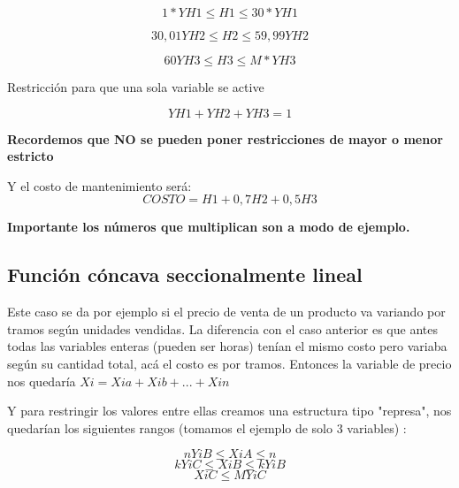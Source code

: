 \documentclass[titlepage,a4paper]{article}
\begin{document}
$$ 1*YH1 \leq H1 \leq 30*YH1 $$

$$ 30,01 YH2 \leq H2 \leq 59,99 YH2$$  

$$60 YH3 \leq H3 \leq M*YH3$$

Restricción para que una sola variable se active

$$YH1 + YH2 + YH3 = 1$$

\textbf{Recordemos que NO se pueden poner restricciones de mayor o menor estricto}

Y el costo de mantenimiento será:
$$ COSTO = H1 + 0,7H2 + 0,5H3 $$

\textbf{Importante los números que multiplican son a modo de ejemplo.}

\vspace{1cm}

\subsection{Función cóncava seccionalmente lineal}

Este caso se da por ejemplo si el precio de venta de un producto va variando por tramos según unidades vendidas. La diferencia con el caso anterior
es que antes todas las variables enteras (pueden ser horas) tenían el mismo costo pero variaba según su cantidad total, acá el costo es por tramos. 
Entonces la variable de precio nos quedaría $Xi = Xia + Xib + ... + Xin$

Y para restringir los valores entre ellas creamos una estructura tipo "represa", nos quedarían los siguientes rangos (tomamos el ejemplo de solo 3 variables) :

$$ n YiB \leq XiA \leq n $$
$$ k YiC \leq XiB \leq k YiB $$
$$ XiC \leq M YiC $$


\vspace{1cm}



\end{document}
